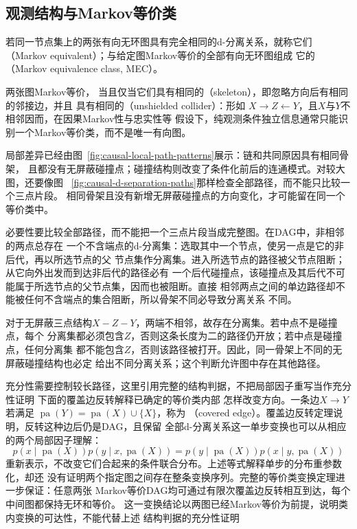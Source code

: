 \subsection{观测结构与Markov等价类}

\begin{definition}[Markov等价与等价类]
  \label{def:causal-markov-equivalence}
若同一节点集上的两张有向无环图具有完全相同的d-分离关系，就称它们
（Markov equivalent）；与给定图Markov等价的全部有向无环图组成
它的（Markov equivalence class, MEC）。
\end{definition}
两张图Markov等价，
当且仅当它们具有相同的（skeleton），即忽略方向后有相同的邻接边，并且
具有相同的（unshielded collider）：形如
\(X\to Z\leftarrow Y\)，且\(X\)与\(Y\)不相邻因而，在因果Markov性与忠实性等
假设下，纯观测条件独立信息通常只能识别一个Markov等价类，而不是唯一有向图。

局部差异已经由图~\ref{fig:causal-local-path-patterns}展示：链和共同原因具有相同骨架，
且都没有无屏蔽碰撞点；碰撞结构则改变了条件化前后的连通模式。对较大图，还要像图
~\ref{fig:causal-d-separation-paths}那样检查全部路径，而不能只比较一个三点片段。
相同骨架且没有新增无屏蔽碰撞点的方向变化，才可能留在同一个等价类中。

必要性要比较全部路径，而不能把一个三点片段当成完整图。在DAG中，非相邻的两点总存在
一个不含端点的d-分离集：选取其中一个节点，使另一点是它的非后代，再以所选节点的父
节点集作分离集。进入所选节点的路径被父节点阻断；从它向外出发而到达非后代的路径必有
一个后代碰撞点，该碰撞点及其后代不可能属于所选节点的父节点集，因而也被阻断。直接
相邻两点之间的单边路径却不能被任何不含端点的集合阻断，所以骨架不同必导致分离关系
不同。

对于无屏蔽三点结构\(X-Z-Y\)，两端不相邻，故存在分离集。若中点不是碰撞点，每个
分离集都必须包含\(Z\)，否则这条长度为二的路径仍开放；若中点是碰撞点，任何分离集
都不能包含\(Z\)，否则该路径被打开。因此，同一骨架上不同的无屏蔽碰撞结构也必定
给出不同分离关系；这个判断允许图中存在其他路径。

充分性需要控制较长路径，这里引用完整的结构判据，不把局部因子重写当作充分性证明
下面的覆盖边反转解释已确定的等价类内部
怎样改变方向。一条边\(X\to Y\)若满足
\(\operatorname{pa}(Y)=\operatorname{pa}(X)\cup\{X\}\)，称为
（covered edge）。覆盖边反转定理说明，反转这种边后仍是DAG，且保留
全部d-分离关系这一单步变换也可以从相应的两个局部因子理解：
\[
  p(x\mid\operatorname{pa}(X))
  p(y\mid x,\operatorname{pa}(X))
  =
  p(y\mid\operatorname{pa}(X))
  p(x\mid y,\operatorname{pa}(X))
\]
重新表示，不改变它们合起来的条件联合分布。上述等式解释单步的分布重参数化，却还
没有证明两个指定图之间存在整条变换序列。完整的等价类变换定理进一步保证：任意两张
Markov等价DAG均可通过有限次覆盖边反转相互到达，每个中间图都保持无环和等价。
这一变换结论以两图已经Markov等价为前提，说明类内变换的可达性，不能代替上述
结构判据的充分性证明

